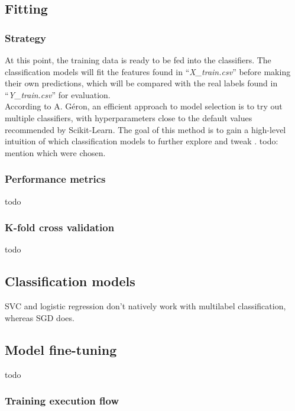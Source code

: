 \documentclass[letterpaper,12pt]{article}
\begin{document}

\subsection{Fitting}

\subsubsection{Strategy}

At this point, the training data is ready to be fed into the classifiers. The classification models will fit the features found in ``\textit{X\_train.csv}'' before making their own predictions, which will be compared with the real labels found in ``\textit{Y\_train.csv}'' for evaluation.\\

According to A. Géron, an efficient approach to model selection is to try out multiple classifiers, with hyperparameters close to the default values recommended by Scikit-Learn. The goal of this method is to gain a high-level intuition of which classification models to further explore and tweak \cite{Geron2019}. todo: mention which were chosen.

\subsubsection{Performance metrics}

todo

\subsubsection{K-fold cross validation}

todo

\subsection{Classification models}

SVC and logistic regression  don't natively work with multilabel classification, whereas SGD does.

\subsection{Model fine-tuning}

todo

\subsubsection{Training  execution flow}
\end{document}
